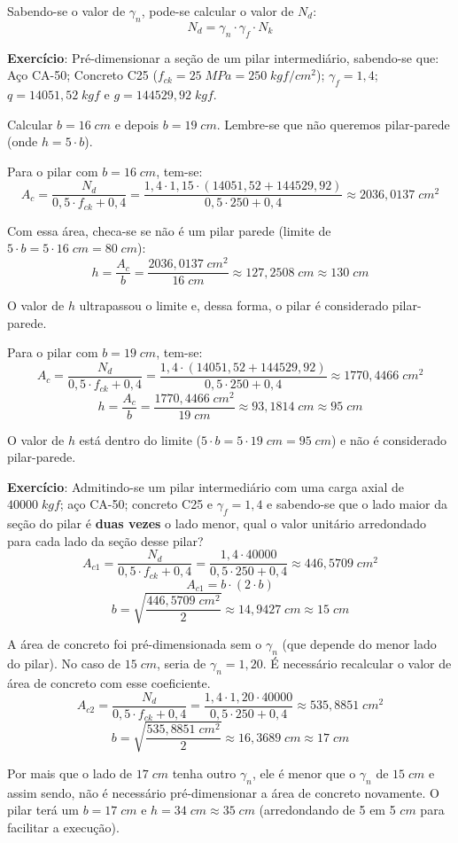 Sabendo-se o valor de $\gamma_n$, pode-se calcular o valor de $N_d$:
\begin{equation}N_d=\gamma_n\cdot\gamma_f\cdot N_k\end{equation}

\textbf{Exercício}: Pré-dimensionar a seção de um pilar intermediário, sabendo-se que: Aço CA-50; Concreto C25 ($f_{ck}=25\;MPa=250\;kgf/{cm}^2$); $\gamma_f=1,4$; $q=14051,52\;kgf$ e $g=144529,92\;kgf$.

Calcular $b=16\;cm$ e depois $b=19\;cm$. Lembre-se que não queremos pilar-parede (onde $h=5\cdot b$).

Para o pilar com $b=16\;cm$, tem-se:
$$A_c=\frac{N_d}{0,5\cdot f_{ck}+0,4}=\frac{1,4\cdot1,15\cdot(14051,52+144529,92)}{0,5\cdot250+0,4}\approx2036,0137\;{cm}^2$$

Com essa área, checa-se se não é um pilar parede (limite de $5\cdot b=5\cdot16\;cm=80\;cm$):
$$h=\frac{A_c}{b}=\frac{2036,0137\;{cm}^2}{16\;cm}\approx127,2508\;cm\approx130\;cm$$

O valor de $h$ ultrapassou o limite e, dessa forma, o pilar é considerado pilar-parede.

Para o pilar com $b=19\;cm$, tem-se:
$$A_c=\frac{N_d}{0,5\cdot f_{ck}+0,4}=\frac{1,4\cdot(14051,52+144529,92)}{0,5\cdot250+0,4}\approx1770,4466\;{cm}^2$$
$$h=\frac{A_c}{b}=\frac{1770,4466\;{cm}^2}{19\;cm}\approx93,1814\;cm\approx95\;cm$$

O valor de $h$ está dentro do limite ($5\cdot b=5\cdot19\;cm=95\;cm$) e não é considerado pilar-parede.

\textbf{Exercício}: Admitindo-se um pilar intermediário com uma carga axial de $40000\;kgf$; aço CA-50; concreto C25 e $\gamma_f=1,4$ e sabendo-se que o lado maior da seção do pilar é \textbf{duas vezes} o lado menor, qual o valor unitário arredondado para cada lado da seção desse pilar?
$$A_{c1}=\frac{N_d}{0,5\cdot f_{ck}+0,4}=\frac{1,4\cdot40000}{0,5\cdot250+0,4}\approx446,5709\;{cm}^2$$
$$A_{c1}=b\cdot(2\cdot b)$$
$$b=\sqrt{\frac{446,5709\;{cm}^2}{2}}\approx14,9427\;cm\approx15\;cm$$

A área de concreto foi pré-dimensionada sem o $\gamma_n$ (que depende do menor lado do pilar). No caso de $15\;cm$, seria de $\gamma_n=1,20$. É necessário recalcular o valor de área de concreto com esse coeficiente.
$$A_{c2}=\frac{N_d}{0,5\cdot f_{ck}+0,4}=\frac{1,4\cdot1,20\cdot40000}{0,5\cdot250+0,4}\approx535,8851\;{cm}^2$$
$$b=\sqrt{\frac{535,8851\;{cm}^2}{2}}\approx16,3689\;cm\approx17\;cm$$

Por mais que o lado de $17\;cm$ tenha outro $\gamma_n$, ele é menor que o $\gamma_n$ de $15\;cm$ e assim sendo, não é necessário pré-dimensionar a área de concreto novamente. O pilar terá um $b=17\;cm$ e $h=34\;cm\approx35\;cm$ (arredondando de 5 em 5 $cm$ para facilitar a execução).